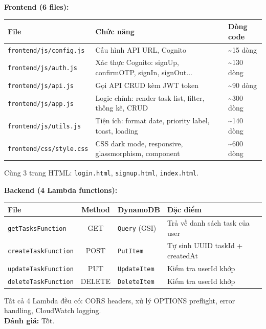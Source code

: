 \documentclass[13pt]{article}
\begin{document}
\textbf{Frontend (6 files):}
\begin{longtable}{|p{}|p{}|p{}|}
\hline
\textbf{File} & \textbf{Chức năng} & \textbf{Dòng code} \\ \hline
\endhead
\texttt{frontend/js/config.js} & Cấu hình API URL, Cognito & \textasciitilde 15 dòng \\ \hline
\texttt{frontend/js/auth.js} & Xác thực Cognito: signUp, confirmOTP, signIn, signOut... & \textasciitilde 130 dòng \\ \hline
\texttt{frontend/js/api.js} & Gọi API CRUD kèm JWT token & \textasciitilde 90 dòng \\ \hline
\texttt{frontend/js/app.js} & Logic chính: render task list, filter, thống kê, CRUD & \textasciitilde 300 dòng \\ \hline
\texttt{frontend/js/utils.js} & Tiện ích: format date, priority label, toast, loading & \textasciitilde 140 dòng \\ \hline
\texttt{frontend/css/style.css} & CSS dark mode, responsive, glassmorphism, component & \textasciitilde 600 dòng \\ \hline
\end{longtable}
Cùng 3 trang HTML: \texttt{login.html}, \texttt{signup.html}, \texttt{index.html}.

\textbf{Backend (4 Lambda functions):}
\begin{longtable}{|p{}|c|p{}|p{}|}
\hline
\textbf{File} & \textbf{Method} & \textbf{DynamoDB} & \textbf{Đặc điểm} \\ \hline
\endhead
\texttt{getTasksFunction} & GET & \texttt{Query} (GSI) & Trả về danh sách task của user \\ \hline
\texttt{createTaskFunction} & POST & \texttt{PutItem} & Tự sinh UUID taskId + createdAt \\ \hline
\texttt{updateTaskFunction} & PUT & \texttt{UpdateItem} & Kiểm tra userId khớp \\ \hline
\texttt{deleteTaskFunction} & DELETE & \texttt{DeleteItem} & Kiểm tra userId khớp \\ \hline
\end{longtable}
Tất cả 4 Lambda đều có: CORS headers, xử lý OPTIONS preflight, error handling, CloudWatch logging.\\
\textbf{Đánh giá:} Tốt.
\end{document}
